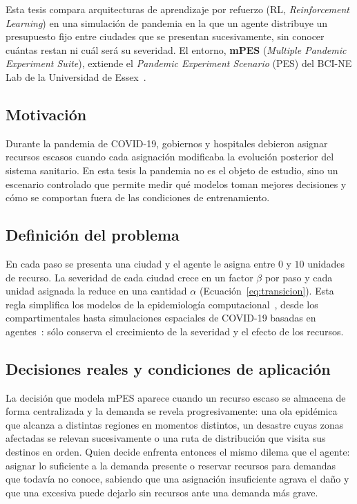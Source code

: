 \documentclass[../00_Main/Main.tex]{subfiles}
\begin{document}
Esta tesis compara arquitecturas de aprendizaje por refuerzo (RL,
\emph{Reinforcement Learning}) en una simulaci\'on de pandemia en la que un
agente distribuye un presupuesto fijo entre ciudades que se presentan sucesivamente, sin conocer cu\'antas
restan ni cu\'al ser\'a su severidad. El entorno, \textbf{mPES} (\emph{Multiple Pandemic
Experiment Suite}), extiende el \emph{Pandemic
Experiment Scenario} (PES) del BCI-NE Lab de la Universidad de
Essex~\citep{BCINE2022}.

\subsection{Motivaci\'on}\label{sec:motivacion}

Durante la pandemia de COVID-19, gobiernos y hospitales debieron
asignar recursos escasos cuando cada asignaci\'on
modificaba la evoluci\'on posterior del sistema sanitario. En esta tesis
la pandemia no es el objeto de estudio, sino un escenario controlado que
permite medir qu\'e modelos toman mejores decisiones y c\'omo se
comportan fuera de las condiciones de entrenamiento.

\subsection{Definici\'on del problema}\label{sec:problema}

En cada paso se presenta una ciudad y el agente le asigna entre $0$ y
$10$ unidades de recurso. La severidad de cada ciudad crece en un factor $\beta$ por paso y
cada unidad asignada la reduce en una cantidad $\alpha$
(Ecuaci\'on~\eqref{eq:transicion}).
Esta regla simplifica los modelos de la epidemiolog\'ia
computacional~\citep{Kuhl2021}, desde los compartimentales hasta
simulaciones espaciales de COVID-19 basadas en agentes~\citep{Parisi2021}:
s\'olo conserva el crecimiento de la severidad y el efecto de los recursos.

\subsection{Decisiones reales y condiciones de aplicaci\'on}\label{sec:aplicaciones}

La decisi\'on que modela mPES aparece cuando un recurso escaso se almacena
de forma centralizada y la demanda se revela progresivamente: una ola
epid\'emica que alcanza a distintas regiones en momentos distintos, un
desastre cuyas zonas afectadas se relevan sucesivamente o una ruta de
distribuci\'on que visita sus destinos en orden. Quien decide enfrenta
entonces el mismo dilema que el agente: asignar lo suficiente a la demanda
presente o reservar recursos para demandas que todav\'ia no conoce,
sabiendo que una asignaci\'on insuficiente agrava el da\~no y que una
excesiva puede dejarlo sin recursos ante una demanda m\'as grave.
\end{document}
